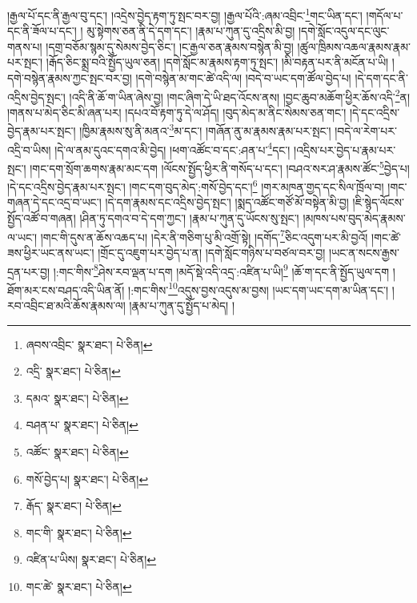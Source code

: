 །རྒྱལ་པོ་དང་ནི་རྒྱལ་བུ་དང་། །འདྲེས་བྱེད་རྟག་ཏུ་སྤང་བར་བྱ། །རྒྱལ་པོའི་:ཞམ་འབྲིང་\footnote{ཞབས་འབྲིང་  སྣར་ཐང་།  པེ་ཅིན། }གང་ཡིན་དང་། །གདོལ་པ་དང་ནི་ཟོལ་པ་དང་། །
མུ་སྟེགས་ཅན་ནི་དེ་དག་དང་། །རྣམ་པ་ཀུན་དུ་འདྲིས་མི་བྱ། །དགེ་སློང་འདུལ་དང་ལུང་གནས་པ། །དགྲ་བཅོམ་སྙམ་དུ་སེམས་བྱེད་ཅིང་། །ང་རྒྱལ་ཅན་རྣམས་བསྙེན་མི་བྱ། །ཚུལ་ཁྲིམས་འཆལ་རྣམས་རྣམ་པར་སྤང་། །རྒོད་ཅིང་སྨྲ་བའི་སྤྱོད་ཡུལ་ཅན། །དགེ་སློང་མ་རྣམས་རྟག་ཏུ་སྤང་། །མི་བརྟན་པར་ནི་མངོན་པ་ཡི། །དགེ་བསྙེན་རྣམས་ཀྱང་སྤང་བར་བྱ། །དགེ་བསྙེན་མ་གང་ཚེ་འདི་ལ། །བདེ་བ་ཡང་དག་ཚོལ་བྱེད་པ། །དེ་དག་དང་ནི་འདྲིས་བྱེད་སྤང་། །འདི་ནི་ཆོ་ག་ཡིན་ཞེས་བྱ། །གང་ཞིག་དེ་ཡི་ཐད་འོངས་ནས། །བྱང་ཆུབ་མཆོག་ཕྱིར་ཆོས་འདི་\footnote{འདྲི་  སྣར་ཐང་།  པེ་ཅིན། }ན། །གནས་པ་མེད་ཅིང་མི་ཞན་པར། །དཔའ་བོ་རྟག་ཏུ་དེ་ལ་ཤོད། །བུད་མེད་མ་ནིང་སེམས་ཅན་གང་། །དེ་དང་འདྲིས་བྱེད་རྣམ་པར་སྤང་། །ཁྱིམ་རྣམས་སུ་ནི་མནའ་\footnote{དམའ་  སྣར་ཐང་།  པེ་ཅིན། }མ་དང་། །གཞོན་ནུ་མ་རྣམས་རྣམ་པར་སྤང་། །བདེ་ལ་རེག་པར་འདྲི་བ་ཡིས། །དེ་ལ་ནམ་དུའང་དགའ་མི་བྱེད། །ཕག་འཚོང་བ་དང་:ཤན་པ་\footnote{བཤན་པ་  སྣར་ཐང་།  པེ་ཅིན། }དང་། །འདྲིས་པར་བྱེད་པ་རྣམ་པར་སྤང་། །གང་དག་སྲོག་ཆགས་རྣམ་མང་དག །ལོངས་སྤྱོད་ཕྱིར་ནི་གསོད་པ་དང་། །བཤའ་སར་ཤ་རྣམས་ཚོང་\footnote{འཚོང་  སྣར་ཐང་།  པེ་ཅིན། }བྱེད་པ། །དེ་དང་འདྲིས་བྱེད་རྣམ་པར་སྤང་། །གང་དག་བུད་མེད་:གསོ་བྱེད་དང་།\footnote{གསོ་བྱེད་པ།  སྣར་ཐང་།  པེ་ཅིན། } །གར་མཁན་གྱད་དང་སིལ་ཁྲོལ་བ། །གང་གཞན་དེ་དང་འདྲ་བ་ཡང་། །དེ་དག་རྣམས་དང་འདྲིས་བྱེད་སྤང་། །སྨད་འཚོང་གཙོ་མོ་བསྟེན་མི་བྱ། །ཇི་སྙེད་ལོངས་སྤྱོད་འཚོ་བ་གཞན། །ཤིན་ཏུ་དགའ་བ་དེ་དག་ཀྱང་། །རྣམ་པ་ཀུན་དུ་ཡོངས་སུ་སྤང་། །མཁས་པས་བུད་མེད་རྣམས་ལ་ཡང་། །གང་གི་དུས་ན་ཆོས་འཆད་པ། །དེར་ནི་གཅིག་པུ་མི་འགྲོ་སྟེ། །དགོད་\footnote{རྒོད་  སྣར་ཐང་།  པེ་ཅིན། }ཅིང་འདུག་པར་མི་བྱའོ། །གང་ཚེ་ཟས་ཕྱིར་ཡང་ནས་ཡང་། །གྲོང་དུ་འཇུག་པར་བྱེད་པ་ན། །དགེ་སློང་གཉིས་པ་བཙལ་བར་བྱ། །ཡང་ན་སངས་རྒྱས་དྲན་པར་བྱ། །:གང་གིས་\footnote{གང་གི་  སྣར་ཐང་།  པེ་ཅིན། }ཤེས་རབ་ལྡན་པ་དག །མདོ་སྡེ་འདི་འདྲ་:འཛིན་པ་ཡི།\footnote{འཛིན་པ་ཡིས།  སྣར་ཐང་།  པེ་ཅིན། } །ཆོ་ག་དང་ནི་སྤྱོད་ཡུལ་དག །ཐོག་མར་ངས་བཤད་འདི་ཡིན་ནོ། །:གང་གིས་\footnote{གང་ཚེ་  སྣར་ཐང་།  པེ་ཅིན། }འདུས་བྱས་འདུས་མ་བྱས། །ཡང་དག་ཡང་དག་མ་ཡིན་དང་། །རབ་འབྲིང་ཐ་མའི་ཆོས་རྣམས་ལ། །རྣམ་པ་ཀུན་དུ་སྤྱོད་པ་མེད། །
